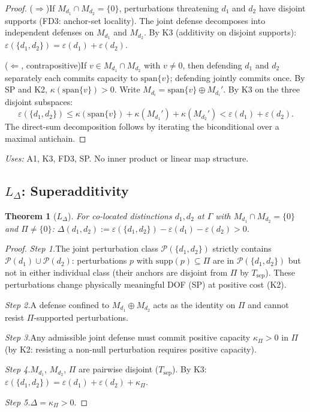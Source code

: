 \documentclass[11pt]{article}
\newtheorem{theorem_app}{Theorem}[section]
\theoremstyle{definition}
\begin{document}
\begin{proof}
($\Rightarrow$)\quad If $M_{d_1} \cap M_{d_2} = \{0\}$, perturbations
threatening $d_1$ and $d_2$ have disjoint supports (FD3: anchor-set
locality).  The joint defense decomposes into independent defenses on
$M_{d_1}$ and $M_{d_2}$.  By K3 (additivity on disjoint supports):
$\varepsilon(\{d_1,d_2\}) = \varepsilon(d_1) + \varepsilon(d_2)$.

($\Leftarrow$, contrapositive)\quad If $v \in M_{d_1} \cap M_{d_2}$
with $v \ne 0$, then defending $d_1$ and $d_2$ separately each commits
capacity to $\mathrm{span}\{v\}$; defending jointly commits once.
By SP and K2, $\kappa(\mathrm{span}\{v\}) > 0$.  Write
$M_{d_i} = \mathrm{span}\{v\} \oplus M_{d_i}'$.  By K3 on the three
disjoint subspaces:
\[
  \varepsilon(\{d_1,d_2\}) \le \kappa(\mathrm{span}\{v\})
  + \kappa(M_{d_1}') + \kappa(M_{d_2}')
  < \varepsilon(d_1) + \varepsilon(d_2).
\]
The direct-sum decomposition follows by iterating the biconditional
over a maximal antichain.
\end{proof}

\noindent\textit{Uses:} A1, K3, FD3, SP.  No inner product or linear
map structure.


\subsection{$L_\Delta$: Superadditivity}
\label{app:LDelta}

\begin{theorem_app}[$L_\Delta$]
For co-located distinctions $d_1, d_2$ at $\Gamma$ with
$M_{d_1} \cap M_{d_2} = \{0\}$ and $\Pi \ne \{0\}$:
$\Delta(d_1,d_2) := \varepsilon(\{d_1,d_2\}) - \varepsilon(d_1)
- \varepsilon(d_2) > 0$.
\end{theorem_app}

\begin{proof}
\textit{Step 1.}\quad The joint perturbation class
$\mathcal{P}(\{d_1,d_2\})$ strictly contains
$\mathcal{P}(d_1) \cup \mathcal{P}(d_2)$: perturbations
$p$ with $\mathrm{supp}(p) \subseteq \Pi$ are in
$\mathcal{P}(\{d_1,d_2\})$ but not in either individual class
(their anchors are disjoint from $\Pi$ by $T_{\mathrm{sep}}$).
These perturbations change physically meaningful DOF (SP) at positive
cost (K2).

\textit{Step 2.}\quad A defense confined to $M_{d_1} \oplus M_{d_2}$
acts as the identity on $\Pi$ and cannot resist $\Pi$-supported
perturbations.

\textit{Step 3.}\quad Any admissible joint defense must commit positive
capacity $\kappa_\Pi > 0$ in $\Pi$ (by K2: resisting a non-null
perturbation requires positive capacity).

\textit{Step 4.}\quad $M_{d_1}$, $M_{d_2}$, $\Pi$ are pairwise disjoint
($T_{\mathrm{sep}}$).  By K3:
$\varepsilon(\{d_1,d_2\}) = \varepsilon(d_1) + \varepsilon(d_2)
+ \kappa_\Pi$.

\textit{Step 5.}\quad $\Delta = \kappa_\Pi > 0$.
\end{proof}
\end{document}
